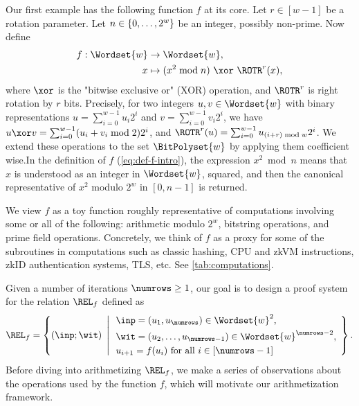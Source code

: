 Our first example has  the following function $f$ at its core. Let $r\in [w-1]$ be a rotation parameter. Let $n\in \range{0}{2^w}$ be an integer, possibly non-prime. Now define
\begin{align}
\label{eq:def-f-intro}
  f : \Wordset{w} &\to \Wordset{w},\nonumber\\
  x &\mapsto (x^2 \bmod n) \ \xor\ \ROTR^r(x),
\end{align}
where $\xor$ is the "bitwise exclusive or" (XOR) operation, and $\ROTR^r$ is right rotation by $r$ bits. Precisely,  for two integers $u,v\in\Wordset{w}$ with binary representations $u = \sum_{i=0}^{w-1} u_i 2^i$ and $v = \sum_{i=0}^{w-1} v_i 2^i$, we have $u \xor v = \sum_{i=0}^{w-1} (u_i + v_i \bmod 2) 2^i$, and $\ROTR^r(u) = \sum_{i=0}^{w-1} u_{(i+r) \bmod w} 2^i$. %
 We extend these operations to the set $\BitPolyset{w}$ by applying them coefficient wise.In the definition of $f$ (\cref{eq:def-f-intro}), the expression $x^2 \bmod n$ means that $x$ is understood as an integer in $\Wordset{w}$, squared, and then the canonical representative of $x^2$  modulo $2^w$ in $[0, n-1]$ is returned.

We view $f$ as a toy function roughly representative of computations involving some or all of the following: arithmetic modulo $2^w$, bitstring operations, and prime field operations. Concretely, we think of $f$ as a proxy for some of the subroutines in computations such as classic hashing, CPU and zkVM instructions, zkID authentication systems, TLS, etc. See  \cref{tab:computations}. %



Given a number of iterations $\numrows\geq 1$, our goal is to design a proof system for the  relation $\REL_f$ defined as
\begin{equation}
\REL_f = \left\{ (\inp;\wit)   \ \left| \  \begin{aligned} &\inp = (u_{1},u_\numrows) \in \Wordset{w}^2,\\ &\wit= (u_2,\ldots, u_{\numrows-1}) \in \Wordset{w}^{\numrows-2},\\   \ &u_{i+1} = f(u_i) \text{ for all } i \in [\numrows-1]  \end{aligned} \ \right.\right\}.
\end{equation}
%
Before diving into arithmetizing $\REL_f$, we make a series of observations about the operations used by the function $f$, which will motivate our arithmetization framework. 


